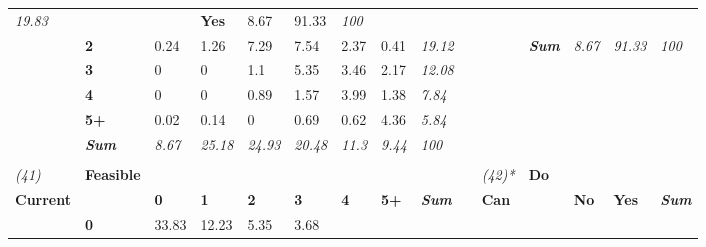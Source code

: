 \begin{table}
{\begin{threeparttable}
\begin{tabular}{lllllllllllllll}
  \textit{19.83} &
   &
   &
  \textbf{Yes} &
  \cellcolor[HTML]{F7F7F7}8.67 &
  \cellcolor[HTML]{A6A6A6}91.33 &
  \textit{100} \\
 &
  \textbf{2} &
  \cellcolor[HTML]{FEFEFE}0.24 &
  \cellcolor[HTML]{F8F8F8}1.26 &
  \cellcolor[HTML]{D5D5D5}7.29 &
  \cellcolor[HTML]{D3D3D3}7.54 &
  \cellcolor[HTML]{F2F2F2}2.37 &
  \cellcolor[HTML]{FDFDFD}0.41 &
  \textit{19.12} &
   &
   &
  \textit{\textbf{Sum}} &
  \textit{8.67} &
  \textit{91.33} &
  \textit{100} \\
 &
  \textbf{3} &
  \cellcolor[HTML]{FFFFFF}0 &
  \cellcolor[HTML]{FFFFFF}0 &
  \cellcolor[HTML]{F9F9F9}1.1 &
  \cellcolor[HTML]{E0E0E0}5.35 &
  \cellcolor[HTML]{EBEBEB}3.46 &
  \cellcolor[HTML]{F3F3F3}2.17 &
  \textit{12.08} &
   &
   &
   &
   &
   &
  \textit{} \\
 &
  \textbf{4} &
  \cellcolor[HTML]{FFFFFF}0 &
  \cellcolor[HTML]{FFFFFF}0 &
  \cellcolor[HTML]{FAFAFA}0.89 &
  \cellcolor[HTML]{F6F6F6}1.57 &
  \cellcolor[HTML]{E8E8E8}3.99 &
  \cellcolor[HTML]{F7F7F7}1.38 &
  \textit{7.84} &
   &
   &
   &
   &
   &
  \textit{} \\
 &
  \textbf{5+} &
  \cellcolor[HTML]{FFFFFF}0.02 &
  \cellcolor[HTML]{FFFFFF}0.14 &
  \cellcolor[HTML]{FFFFFF}0 &
  \cellcolor[HTML]{FBFBFB}0.69 &
  \cellcolor[HTML]{FCFCFC}0.62 &
  \cellcolor[HTML]{E6E6E6}4.36 &
  \textit{5.84} &
   &
   &
   &
   &
   &
  \textit{} \\
\textit{} &
  \textit{\textbf{Sum}} &
  \textit{8.67} &
  \textit{25.18} &
  \textit{24.93} &
  \textit{20.48} &
  \textit{11.3} &
  \textit{9.44} &
  \textit{100} &
  \textit{} &
  \textit{} &
  \textit{} &
  \textit{} &
  \textit{} &
  \textit{} \\
\textit{} &
  \textit{\textbf{}} &
  \textit{} &
  \textit{} &
  \textit{} &
  \textit{} &
  \textit{} &
  \textit{} &
  \textit{} &
  \textit{} &
  \textit{} &
  \textit{} &
  \textit{} &
  \textit{} &
  \textit{} \\
\textit{(41)} &
  \textbf{Feasible} &
   &
   &
   &
   &
   &
   &
  \textit{} &
   &
  \textit{(42)*} &
  \textbf{Do} &
   &
   &
  \textit{} \\
\textbf{Current} &
   &
  \textbf{0} &
  \textbf{1} &
  \textbf{2} &
  \textbf{3} &
  \textbf{4} &
  \textbf{5+} &
  \textit{\textbf{Sum}} &
  \textbf{} &
  \textbf{Can} &
   &
  \textbf{No} &
  \textbf{Yes} &
  \textit{\textbf{Sum}} \\
 &
  \textbf{0} &
  \cellcolor[HTML]{A6A6A6}33.83 &
  \cellcolor[HTML]{DFDFDF}12.23 &
  \cellcolor[HTML]{F1F1F1}5.35 &
  \cellcolor[HTML]{F6F6F6}3.68 &

\end{tabular}
\end{threeparttable}}
\end{table}
